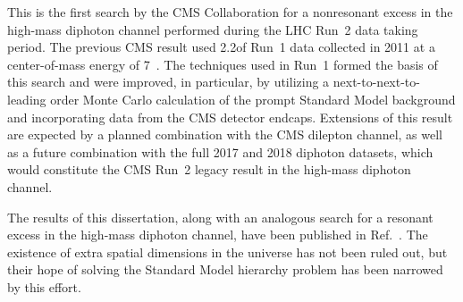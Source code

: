 This is the first search by the CMS Collaboration for a nonresonant excess in the high-mass diphoton channel performed during the LHC Run~2 data taking period. The previous CMS result used 2.2\fbinv of Run~1 data collected in 2011 at a center-of-mass energy of 7\TeV~\cite{Chatrchyan:2011fq}. The techniques used in Run~1 formed the basis of this search and were improved, in particular, by utilizing a next-to-next-to-leading order Monte Carlo calculation of the prompt Standard Model background and incorporating data from the CMS detector endcaps. Extensions of this result are expected by a planned combination with the CMS dilepton channel, as well as a future combination with the full 2017 and 2018 diphoton datasets, which would constitute the CMS Run~2 legacy result in the high-mass diphoton channel. 

The results of this dissertation, along with an analogous search for a resonant excess in the high-mass diphoton channel, have been published in Ref.~\cite{Sirunyan:2018wnk}. The existence of extra spatial dimensions in the universe has not been ruled out, but their hope of solving the Standard Model hierarchy problem has been narrowed by this effort.